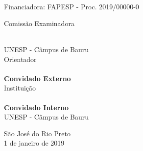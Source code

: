 \documentclass[
	12pt,				%
	openright,			%
	oneside,			%
	a4paper,			%
	english,			%
	french,				%
	spanish,			%
	brazil				%
	]{abntex2}
\begin{document}
%
% 
%
\begin{folhadeaprovacao}
	
	\begin{center}
		{\ABNTEXchapterfont\large\imprimirautor}
		
		\vspace*{\fill}\vspace*{\fill}
		\begin{center}
			\ABNTEXchapterfont\bfseries\Large\imprimirtitulo
		\end{center}
		\vspace*{\fill}
		    
		\hspace{.45\textwidth}
		\begin{minipage}{.5\textwidth}
			\imprimirpreambulo
			\\~\\
			Financiadora: FAPESP - Proc. 2019/00000-0
		\end{minipage}%
		\vspace*{\fill}
	\end{center}
	        
	\center Comissão Examinadora
	  
	\begin{flushleft}
		\textbf{\imprimirorientador} \\ UNESP - Câmpus de Bauru \\ Orientador
		\\~\\
		\textbf{Convidado Externo} \\ Instituição
		\\~\\
		\textbf{Convidado Interno} \\ UNESP - Câmpus de Bauru
	\end{flushleft}
	      
	\begin{center}
		\vspace*{0.5cm}
		\par
		{São José do Rio Preto \\ 1 de janeiro de 2019}
		\vspace*{1cm}
	\end{center}
	  
\end{folhadeaprovacao}
\end{document}
